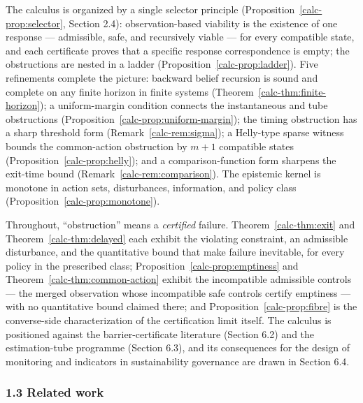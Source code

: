 \documentclass[10pt,twocolumn]{article}
\theoremstyle{definition}
\begin{document}
The calculus is organized by a single selector principle (Proposition~\ref{calc-prop:selector}, Section 2.4):
observation-based viability is the existence of one response ---
admissible, safe, and recursively viable --- for every compatible state,
and each certificate proves that a specific response correspondence is
empty; the obstructions are nested in a ladder
(Proposition~\ref{calc-prop:ladder}). Five refinements complete the picture:
backward belief recursion is sound and complete on any finite horizon
in finite systems (Theorem~\ref{calc-thm:finite-horizon}); a uniform-margin
condition connects the instantaneous and tube obstructions
(Proposition~\ref{calc-prop:uniform-margin}); the timing obstruction has a
sharp threshold form (Remark~\ref{calc-rem:sigma}); a Helly-type sparse
witness bounds the common-action obstruction by \(m+1\) compatible
states (Proposition~\ref{calc-prop:helly}); and a comparison-function form
sharpens the exit-time bound (Remark~\ref{calc-rem:comparison}). The epistemic kernel is monotone in
action sets, disturbances, information, and policy class
(Proposition~\ref{calc-prop:monotone}).

Throughout, ``obstruction'' means a \emph{certified} failure. Theorem~\ref{calc-thm:exit} and Theorem~\ref{calc-thm:delayed} each exhibit the violating constraint, an admissible disturbance,
and the quantitative bound that make failure inevitable, for every policy in the prescribed class; Proposition~\ref{calc-prop:emptiness} and Theorem~\ref{calc-thm:common-action} exhibit the incompatible
admissible controls --- the merged observation whose incompatible safe
controls certify emptiness --- with no quantitative bound claimed there;
and Proposition~\ref{calc-prop:fibre} is the converse-side characterization of the certification
limit itself. The calculus is positioned against
the barrier-certificate literature (Section 6.2) and the estimation-tube
programme (Section 6.3), and its consequences for the design of
monitoring and indicators in sustainability governance are drawn in
Section 6.4.

\subsubsection{1.3 Related work}\label{calc-related-work}
\end{document}

